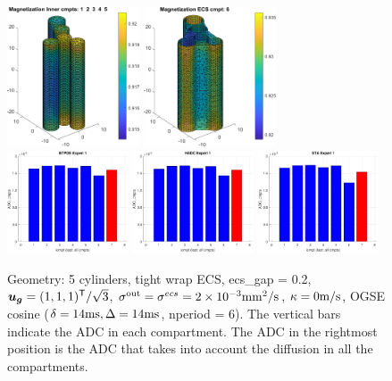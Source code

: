\documentclass[a4paper]{article}
\begin{document}
\begin{figure}
    \centering
    \includegraphics[width=0.35\textwidth]{plot_magnetization/sec42_in.png} \quad
    \includegraphics[width=0.35\textwidth]{plot_magnetization/sec42_ecs.png} \\
    \vspace{0.8cm}
    \includegraphics[width=0.32\textwidth]{plot_adc/btpde_sec42.pdf}
    \includegraphics[width=0.32\textwidth]{plot_adc/hadc_sec42.pdf}
    \includegraphics[width=0.32\textwidth]{plot_adc/sta_sec42.pdf}
    \caption{Geometry: 5 cylinders, tight wrap ECS, ecs\_gap = 0.2, $\bm{u}_{\bm{g}}=(1,1,1)^{\mathsf{T}} / \sqrt{3}$, $\sigma^\text{out}=\sigma^{ecs}=2\times10^{-3}\mathrm{mm^2/s}$, $\kappa=0\mathrm{m/s}$, OGSE cosine ($\delta=14\mathrm{ms},\Delta=14\mathrm{ms}$, nperiod = 6). The vertical bars indicate the ADC in each compartment. The ADC in the rightmost position is the ADC that takes into account the diffusion in all the compartments.}
    \label{fig:STA}
\end{figure}
\end{document}
